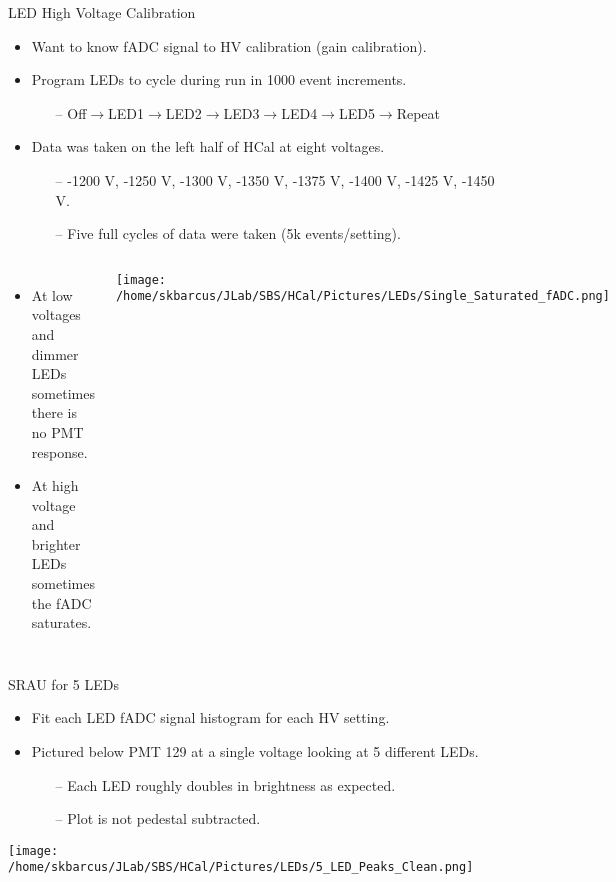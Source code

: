\documentclass[10pt]{beamer}
\begin{document}
\begin{frame}{LED High Voltage Calibration}

	\begin{itemize}
		\item Want to know fADC signal to HV calibration (gain calibration).
		\item Program LEDs to cycle during run in 1000 event increments.
			\begin{itemize}
				\item[--] Off$\rightarrow$LED1$\rightarrow$LED2$\rightarrow$LED3$\rightarrow$LED4$\rightarrow$LED5$\rightarrow$Repeat
			\end{itemize}
		\item Data was taken on the left half of HCal at eight voltages.
			\begin{itemize}
				\item[--] -1200 V, -1250 V, -1300 V, -1350 V, -1375 V, -1400 V, -1425 V, -1450 V.
				\item[--] Five full cycles of data were taken (5k events/setting).
			\end{itemize}
	\end{itemize}
	
	\begin{columns}[T,onlytextwidth]
	\begin{itemize}
		\item At low voltages and dimmer LEDs sometimes there is no PMT response.
		\item At high voltage and brighter LEDs sometimes the fADC saturates.
	\end{itemize}
	
	\vspace{-4mm}
	\begin{center}
		\texttt{[image: /home/skbarcus/JLab/SBS/HCal/Pictures/LEDs/Single\_Saturated\_fADC.png]}
  	\end{center}
  	
	\end{columns}

\end{frame}

\begin{frame}{SRAU for 5 LEDs}

	\begin{itemize}
		\item Fit each LED fADC signal histogram for each HV setting.
		\item Pictured below PMT 129 at a single voltage looking at 5 different LEDs.
		\begin{itemize}
			\item[--] Each LED roughly doubles in brightness as expected.
			\item[--] Plot is not pedestal subtracted.
		\end{itemize}
	\end{itemize}

	\begin{center}
		\texttt{[image: /home/skbarcus/JLab/SBS/HCal/Pictures/LEDs/5\_LED\_Peaks\_Clean.png]}
  	\end{center}

\end{frame}
\end{document}
